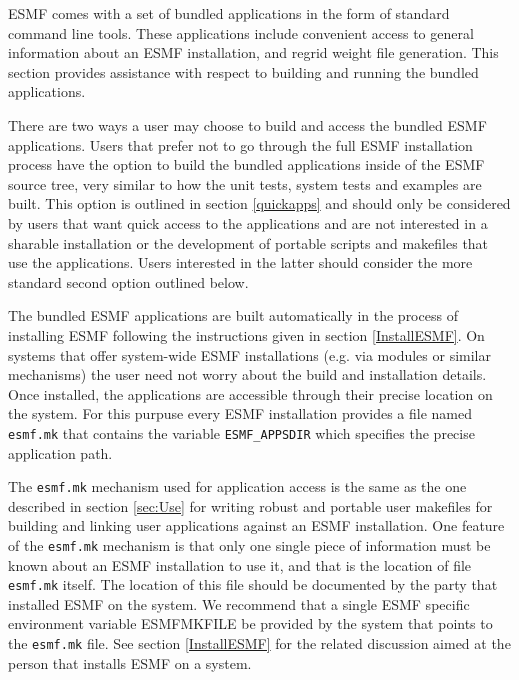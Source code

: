 
ESMF comes with a set of bundled applications in the form of standard command 
line tools. These applications include convenient access to general information 
about an ESMF installation, and regrid weight file generation. This section 
provides assistance with respect to building and running the bundled 
applications.

There are two ways a user may choose to build and access the bundled ESMF 
applications. Users that prefer not to go through the full ESMF installation 
process have the option to build the bundled applications inside of the ESMF 
source tree, very similar to how the unit tests, system tests and examples are 
built. This option is outlined in section \ref{quickapps} and should only be 
considered by users that want quick access to the applications and are not 
interested in a sharable installation or the development of portable scripts and 
makefiles that use the applications. Users interested in the latter should 
consider the more standard second option outlined below.

The bundled ESMF applications are built automatically in the process of 
installing ESMF following the instructions given in section \ref{InstallESMF}. 
On systems that offer system-wide ESMF installations (e.g. via modules or 
similar mechanisms) the user need not worry about the build and installation 
details. Once installed, the applications are accessible through their precise 
location on the system. For this purpuse every ESMF installation provides a file 
named {\tt esmf.mk} that contains the variable {\tt ESMF\_APPSDIR} which 
specifies the precise application path.

The {\tt esmf.mk} mechanism used for application access is the same as the one 
described in section \ref{sec:Use} for writing robust and portable user 
makefiles for building and linking user applications against an ESMF 
installation. One feature of the {\tt esmf.mk} mechanism is that only one single 
piece of information must be known about an ESMF installation to use it, and 
that is the location of file {\tt esmf.mk} itself. The location of this file 
should be documented by the party that installed ESMF on the system. We 
recommend that a single ESMF specific environment variable ESMFMKFILE be 
provided by the system that points to the {\tt esmf.mk} file. See section 
\ref{InstallESMF} for the related discussion aimed at the person that installs 
ESMF on a system.

